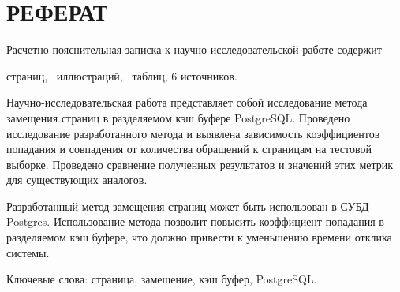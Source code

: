 

 

\setcounter{page}{3}

\chapter*{РЕФЕРАТ}
Расчетно-пояснительная записка к научно-исследовательской работе содержит  \begin{NoHyper}\pageref{LastPage}\end{NoHyper} страниц, \totfig~иллюстраций, \tottab~таблиц, 6 источников.

Научно-исследовательская работа представляет собой исследование метода замещения страниц в разделяемом кэш буфере PostgreSQL. 
Проведено исследование разработанного метода и выявлена зависимость коэффициентов попадания и совпадения от количества обращений к страницам на тестовой выборке.
Проведено сравнение полученных результатов и значений этих метрик для существующих аналогов.

Разработанный метод замещения страниц может быть использован в СУБД Postgres.
Использование метода позволит повысить коэффициент попадания в разделяемом кэш буфере, что должно привести к уменьшению времени отклика системы.
 
Ключевые слова: страница, замещение, кэш буфер, PostgreSQL.